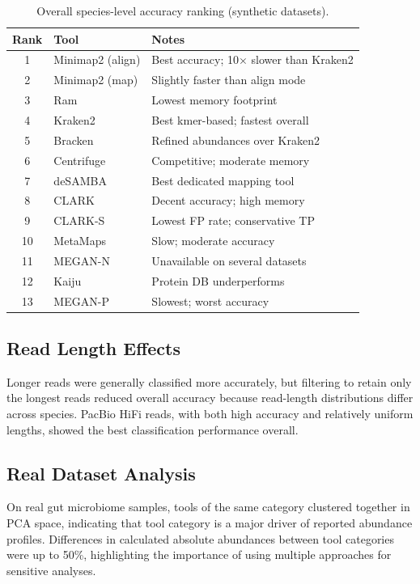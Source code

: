 \documentclass[11pt]{article}
\begin{document}
\begin{table}[ht]
\centering
\caption{Overall species-level accuracy ranking (synthetic datasets).}
\label{tab:rankings}
\begin{tabular}{@{}clp{7cm}@{}}
\toprule
Rank & Tool & Notes \\
\midrule
1 & Minimap2 (align) & Best accuracy; 10$\times$ slower than Kraken2 \\
2 & Minimap2 (map) & Slightly faster than align mode \\
3 & Ram & Lowest memory footprint \\
4 & Kraken2 & Best kmer-based; fastest overall \\
5 & Bracken & Refined abundances over Kraken2 \\
6 & Centrifuge & Competitive; moderate memory \\
7 & deSAMBA & Best dedicated mapping tool \\
8 & CLARK & Decent accuracy; high memory \\
9 & CLARK-S & Lowest FP rate; conservative TP \\
10 & MetaMaps & Slow; moderate accuracy \\
11 & MEGAN-N & Unavailable on several datasets \\
12 & Kaiju & Protein DB underperforms \\
13 & MEGAN-P & Slowest; worst accuracy \\
\bottomrule
\end{tabular}
\end{table}

\subsection{Read Length Effects}

Longer reads were generally classified more accurately, but filtering to retain only the longest reads reduced overall accuracy because read-length distributions differ across species.  PacBio HiFi reads, with both high accuracy and relatively uniform lengths, showed the best classification performance overall.

\subsection{Real Dataset Analysis}

On real gut microbiome samples, tools of the same category clustered together in PCA space, indicating that tool category is a major driver of reported abundance profiles.  Differences in calculated absolute abundances between tool categories were up to 50\%, highlighting the importance of using multiple approaches for sensitive analyses.
\end{document}
